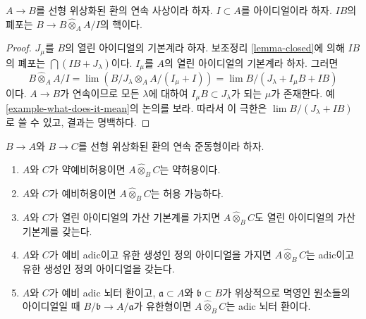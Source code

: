\begin{lemma}
\label{lemma-closure-image-ideal}
$A \to B$를 선형 위상화된 환의 연속 사상이라 하자.
$I \subset A$를 아이디얼이라 하자. $IB$의 폐포는
$B \to B \widehat{\otimes}_A A/I$의 핵이다.
\end{lemma}

\begin{proof}
$J_\mu$를 $B$의 열린 아이디얼의 기본계라 하자. 보조정리
\ref{lemma-closed}에 의해 $IB$의 폐포는
$\bigcap (IB + J_\lambda)$이다. $I_\mu$를 $A$의 열린 아이디얼의
기본계라 하자. 그러면
$$
B \widehat{\otimes}_A A/I = \lim (B/J_\lambda \otimes_A A/(I_\mu + I)) =
\lim B/(J_\lambda + I_\mu B + I B)
$$
이다. $A \to B$가 연속이므로 모든 $\lambda$에 대하여
$I_\mu B \subset J_\lambda$가 되는 $\mu$가 존재한다. 예
\ref{example-what-does-it-mean}의 논의를 보라. 따라서 이 극한은
$\lim B/(J_\lambda + IB)$로 쓸 수 있고, 결과는 명백하다.
\end{proof}

\begin{lemma}
\label{lemma-completed-tensor-product}
$B \to A$와 $B \to C$를 선형 위상화된 환의 연속 준동형이라 하자.
\begin{enumerate}
\item $A$와 $C$가 약예비허용이면 $A \widehat{\otimes}_B C$는
약허용이다.
\item $A$와 $C$가 예비허용이면 $A \widehat{\otimes}_B C$는
허용 가능하다.
\item $A$와 $C$가 열린 아이디얼의 가산 기본계를 가지면
$A \widehat{\otimes}_B C$도 열린 아이디얼의 가산 기본계를 갖는다.
\item $A$와 $C$가 예비 adic이고 유한 생성인 정의 아이디얼을 가지면
$A \widehat{\otimes}_B C$는 adic이고 유한 생성인 정의 아이디얼을
갖는다.
\item $A$와 $C$가 예비 adic 뇌터 환이고,
$\mathfrak a \subset A$와 $\mathfrak b \subset B$가 위상적으로
멱영인 원소들의 아이디얼일 때
$B/\mathfrak b \to A/\mathfrak a$가 유한형이면
$A \widehat{\otimes}_B C$는 adic 뇌터 환이다.
\end{enumerate}
\end{lemma}

